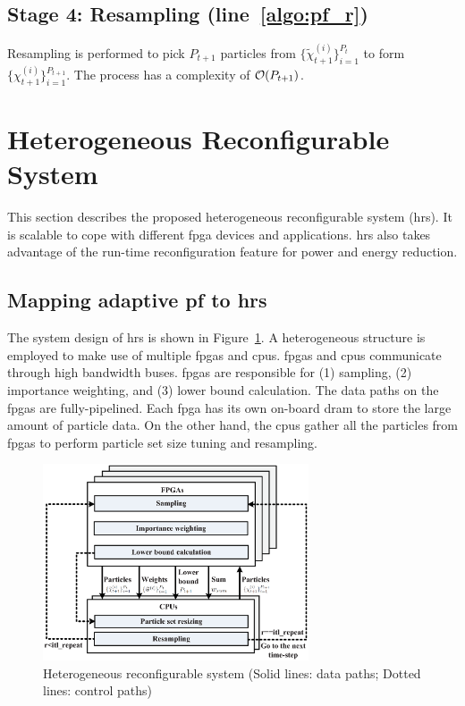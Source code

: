 \subsection{Stage 4: Resampling (line~\ref{algo:pf_r})}
Resampling is performed to pick $P_{t+1}$ particles from $\{\widetilde{\chi}_{t+1}^{(i)}\}^{P_t}_{i=1}$ to form $\{\chi_{t+1}^{(i)}\}^{P_{t+1}}_{i=1}$.
The process has a complexity of $\mathop{}\mathopen{}\mathcal{O}\mathopen{}\left(P_{t+1}\right)$.

\section{Heterogeneous Reconfigurable System}
\label{sec:hrs}

This section describes the proposed heterogeneous reconfigurable system (\gls{hrs}).
It is scalable to cope with different \gls{fpga} devices and applications.
\gls{hrs} also takes advantage of the run-time reconfiguration feature for power and energy reduction.

\subsection{Mapping adaptive \gls{pf} to \gls{hrs}}
\label{sec:arch}

The system design of \gls{hrs} is shown in Figure~\ref{fig:arch}.
A heterogeneous structure is employed to make use of multiple \gls{fpga}s and \gls{cpu}s.
\gls{fpga}s and \gls{cpu}s communicate through high bandwidth buses.
\gls{fpga}s are responsible for (1) sampling, (2) importance weighting, and (3) lower bound calculation.
The data paths on the \gls{fpga}s are fully-pipelined.
Each \gls{fpga} has its own on-board \gls{dram} to store the large amount of particle data.
On the other hand, the \gls{cpu}s gather all the particles from \gls{fpga}s to perform particle set size tuning and resampling.

\begin{figure}[t!]
\centering
\includegraphics[width=0.7\textwidth]{runtime_reconfiguration/figures/fig_arch}
\caption{Heterogeneous reconfigurable system (Solid lines: data paths; Dotted lines: control paths)}
\label{fig:arch}
\end{figure}


